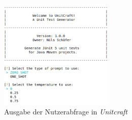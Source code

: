 \begin{figure}[h]
    \centering
    \includegraphics[width=0.48\textwidth]{Assets/Images/user.png}
    \caption{Ausgabe der Nutzerabfrage in \textit{Unitcraft}}
    \label{fig:user}
\end{figure}